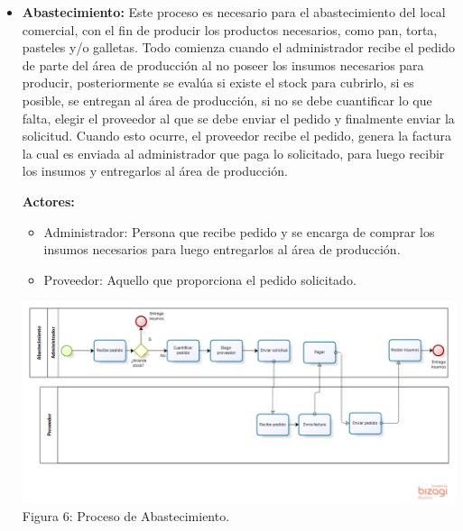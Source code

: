 \begin{itemize}
\item \textbf{Abastecimiento:}
Este proceso es necesario para el abastecimiento del local comercial, con el fin de producir los productos necesarios, como pan, torta, pasteles y/o galletas. Todo comienza cuando el administrador recibe el pedido de parte del área de producción al no poseer los insumos necesarios para producir, posteriormente se evalúa si existe el stock para cubrirlo, si es posible, se entregan al área de producción, si no se debe cuantificar lo que falta, elegir el proveedor al que se debe enviar el pedido y finalmente enviar la solicitud. Cuando esto ocurre, el proveedor recibe el pedido, genera la factura la cual es enviada al administrador que paga lo solicitado, para luego recibir los insumos y entregarlos al área de producción.

\textbf{Actores:} 
\begin{itemize}
\item Administrador: Persona que recibe pedido y se encarga de comprar los insumos necesarios para luego entregarlos al área de producción.
\item Proveedor: Aquello que proporciona el pedido solicitado.
\end{itemize}

\begin{center}
\includegraphics[width=15cm]{./imagenes/Abastecimiento.png}\\
Figura 6: Proceso de Abastecimiento.
\end{center}

\end{itemize}

